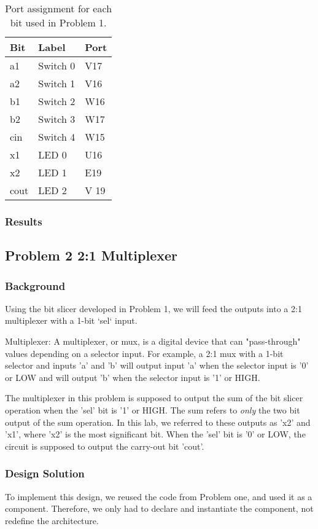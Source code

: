 \documentclass[11pt]{article}
\begin{document}
\begin{table}[H]
\begin{center}
	\begin{tabular}{| l | l | l |}
		\hline
		Bit & Label & Port \\ \hline
		a1 & Switch 0 & V17 \\ \hline
		a2 & Switch 1 & V16 \\ \hline
		b1 & Switch 2 & W16 \\ \hline
		b2 & Switch 3 & W17 \\ \hline
		cin & Switch 4 & W15 \\ \hline
		x1 & LED 0 & U16 \\ \hline
		x2 & LED 1 & E19 \\ \hline
		cout & LED 2 & V 19 \\ \hline
	\end{tabular}
	\caption{\label{tab:slicerPinAssignments}Port assignment for each bit used in Problem 1.}
\end{center}
\end{table}

\subsubsection{Results}


\subsection{Problem 2 2:1 Multiplexer}

\subsubsection{Background}
Using the bit slicer developed in Problem 1, we will feed the outputs into a 2:1 multiplexer with a 1-bit `sel` input. 

\begin{definition}
	Multiplexer: A multiplexer, or mux, is a digital device that can "pass-through" values depending on a selector input. For example, a 2:1 mux with a 1-bit selector and inputs 'a' and 'b' will output input 'a' when the selector input is '0' or LOW and will output 'b' when the selector input is '1' or HIGH.
\end{definition}

The multiplexer in this problem is supposed to output the sum of the bit slicer operation when the 'sel' bit is '1' or HIGH. The sum refers to \textit{only} the two bit output of the sum operation. In this lab, we referred to these outputs as 'x2' and 'x1', where 'x2' is the most significant bit. When the 'sel' bit is '0' or LOW, the circuit is supposed to output the carry-out bit 'cout'. 

\subsubsection{Design Solution}
To implement this design, we reused the code from Problem one, and used it as a component. Therefore, we only had to declare and instantiate the component, not redefine the architecture.
\end{document}
